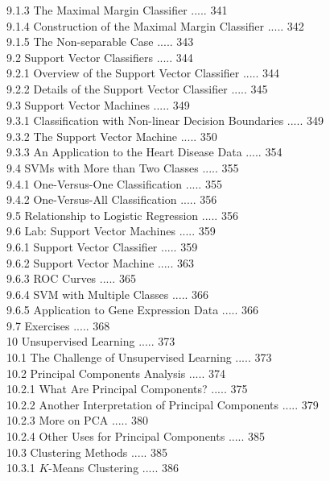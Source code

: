 \documentclass[10pt]{article}
\begin{document}
9.1.3 The Maximal Margin Classifier ..... 341\\
9.1.4 Construction of the Maximal Margin Classifier ..... 342\\
9.1.5 The Non-separable Case ..... 343\\
9.2 Support Vector Classifiers ..... 344\\
9.2.1 Overview of the Support Vector Classifier ..... 344\\
9.2.2 Details of the Support Vector Classifier ..... 345\\
9.3 Support Vector Machines ..... 349\\
9.3.1 Classification with Non-linear Decision Boundaries ..... 349\\
9.3.2 The Support Vector Machine ..... 350\\
9.3.3 An Application to the Heart Disease Data ..... 354\\
9.4 SVMs with More than Two Classes ..... 355\\
9.4.1 One-Versus-One Classification ..... 355\\
9.4.2 One-Versus-All Classification ..... 356\\
9.5 Relationship to Logistic Regression ..... 356\\
9.6 Lab: Support Vector Machines ..... 359\\
9.6.1 Support Vector Classifier ..... 359\\
9.6.2 Support Vector Machine ..... 363\\
9.6.3 ROC Curves ..... 365\\
9.6.4 SVM with Multiple Classes ..... 366\\
9.6.5 Application to Gene Expression Data ..... 366\\
9.7 Exercises ..... 368\\
10 Unsupervised Learning ..... 373\\
10.1 The Challenge of Unsupervised Learning ..... 373\\
10.2 Principal Components Analysis ..... 374\\
10.2.1 What Are Principal Components? ..... 375\\
10.2.2 Another Interpretation of Principal Components ..... 379\\
10.2.3 More on PCA ..... 380\\
10.2.4 Other Uses for Principal Components ..... 385\\
10.3 Clustering Methods ..... 385\\
10.3.1 $K$-Means Clustering ..... 386\\
\end{document}
